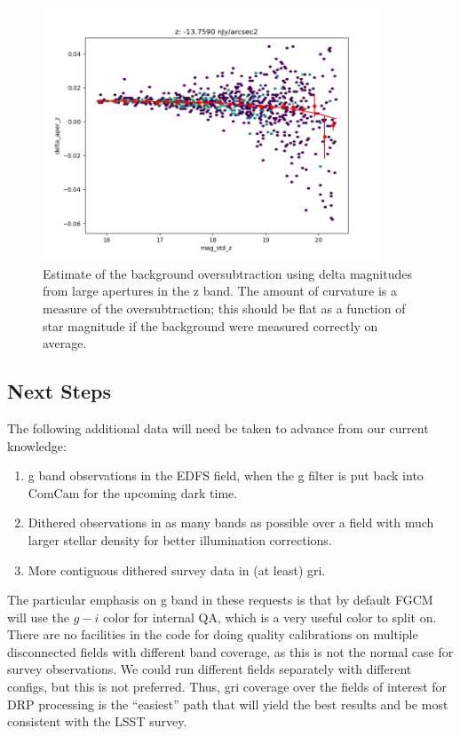 \begin{figure}
  \begin{center}
    \includegraphics[width=0.9\textwidth]{photometric_calibration_figures/background_oversubtraction_z.png}
  \end{center}
  \caption{Estimate of the background oversubtraction using delta magnitudes
    from large apertures in the z band.  The amount of curvature is a measure
    of the oversubtraction; this should be flat as a function of star magnitude
    if the background were measured correctly on average.}
\end{figure}

\subsection{Next Steps}

The following additional data will need be taken to advance from our current
knowledge:

\begin{enumerate}
  \item{g band observations in the EDFS field, when the g filter is put back
    into ComCam for the upcoming dark time.}
  \item{Dithered observations in as many bands as possible over a field with
    much larger stellar density for better illumination corrections.}
  \item{More contiguous dithered survey data in (at least) gri.}
\end{enumerate}

The particular emphasis on g band in these requests is that by default FGCM
will use the $g-i$ color for internal QA, which is a very useful color to split
on.  There are no facilities in the code for doing quality calibrations on
multiple disconnected fields with different band coverage, as this is not the
normal case for survey observations.  We could run different fields separately
with different configs, but this is not preferred.  Thus, gri coverage over the
fields of interest for DRP processing is the ``easiest'' path that will yield
the best results and be most consistent with the LSST survey.

